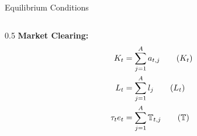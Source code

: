 \documentclass[aspectratio=1610]{beamer}
\begin{document}
\begin{frame}[fragile]{Equilibrium Conditions}
\begin{small}
\begin{columns}
        \begin{column}{0.5\textwidth}
            \textbf{Market Clearing:}
            \begin{align}
                K_t & = \sum_{j = 1}^{A} a_{t,j} \tag{$K_t$}\\
            L_t & = \sum_{j = 1}^{A} l_j \tag{$L_t$} \\
            \tau_{t} e_t & = \sum_{j=1}^{A} \mathbb{T}_{t,j}  \tag{$\mathbb{T}$}
            \end{align}
        \end{column}
  \end{columns}
\end{small}
\end{frame}
\end{document}

